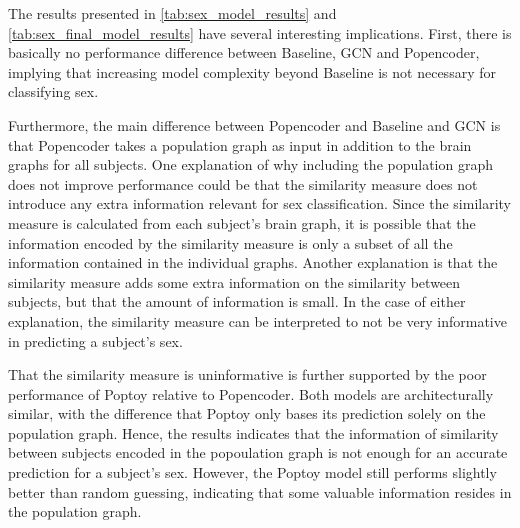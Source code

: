 The results presented in \ref{tab:sex_model_results} and \ref{tab:sex_final_model_results} have several interesting implications. First, there is basically no performance difference between Baseline, GCN and Popencoder, implying that increasing model complexity beyond Baseline is not necessary for classifying sex. 

Furthermore, the main difference between Popencoder and Baseline and GCN is that Popencoder takes a population graph as input in addition to the brain graphs for all subjects. One explanation of why including the population graph does not improve performance could be that the similarity measure does not introduce any extra information relevant for sex classification. Since the similarity measure is calculated from each subject's brain graph, it is possible that the information encoded by the similarity measure is only a subset of all the information contained in the individual graphs. Another explanation is that the similarity measure adds some extra information on the similarity between subjects, but that the amount of information is small. In the case of either explanation, the similarity measure can be interpreted to not be very informative in predicting a subject's sex. 

That the similarity measure is uninformative is further supported by the poor performance of Poptoy relative to Popencoder. Both models are architecturally similar, with the difference that Poptoy only bases its prediction solely on the population graph. Hence, the results indicates that the information of similarity between subjects encoded in the popoulation graph is not enough for an accurate prediction for a subject's sex. However, the Poptoy model still performs slightly better than random guessing, indicating that some valuable information resides in the population graph. 



